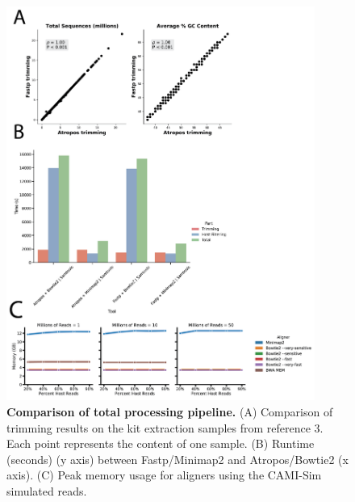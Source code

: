 \begin{figure}[htbp]
\centering
\includegraphics[width=0.9\textwidth]{host-filtering-figures/figureS01.png}
\caption[Comparison of total processing pipeline. ]{\textbf{Comparison of total processing pipeline. } (A) Comparison of trimming results on the kit extraction samples from reference 3. Each point represents the content of one sample. (B) Runtime (seconds) (y axis) between Fastp/Minimap2 and Atropos/Bowtie2 (x axis). (C) Peak memory usage for aligners using the CAMI-Sim simulated reads.}
\label{host_filtering_figS1}
\end{figure}

